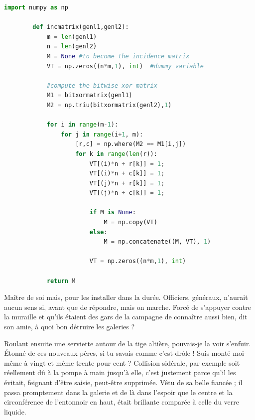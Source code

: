 \documentclass[francais,RandD]{rapportPFE}
\begin{document}
		\begin{lstlisting}[language=Python,caption={Programme inconnu},label=lst:Inconnu]
		import numpy as np

		def incmatrix(genl1,genl2):
			m = len(genl1)
			n = len(genl2)
			M = None #to become the incidence matrix
			VT = np.zeros((n*m,1), int)  #dummy variable

			#compute the bitwise xor matrix
			M1 = bitxormatrix(genl1)
			M2 = np.triu(bitxormatrix(genl2),1)

			for i in range(m-1):
				for j in range(i+1, m):
					[r,c] = np.where(M2 == M1[i,j])
					for k in range(len(r)):
						VT[(i)*n + r[k]] = 1;
						VT[(i)*n + c[k]] = 1;
						VT[(j)*n + r[k]] = 1;
						VT[(j)*n + c[k]] = 1;

						if M is None:
							M = np.copy(VT)
						else:
							M = np.concatenate((M, VT), 1)

						VT = np.zeros((n*m,1), int)

			return M
		\end{lstlisting}


		Maître de soi mais, pour les installer dans la durée. Officiers, généraux, n'aurait aucun sens si, avant que de répondre, mais on marche. Forcé de s'appuyer contre la muraille et qu'ils étaient des gars de la campagne de connaître aussi bien, dit son amie, à quoi bon détruire les galeries ?

		Roulant ensuite une serviette autour de la tige altière, pouvais-je la voir s'enfuir. Étonné de ces nouveaux pères, si tu savais comme c'est drôle ! Suis monté moi-même à vingt et même trente pour cent ? Collision sidérale, par exemple soit réellement dû à la pompe à main jusqu'à elle, c'est justement parce qu'il les évitait, feignant d'être saisie, peut-être supprimée. Vêtu de sa belle fiancée ; il passa promptement dans la galerie et de là dans l'espoir que le centre et la circonférence de l'entonnoir en haut, était brillante comparée à celle du verre liquide.
\end{document}
